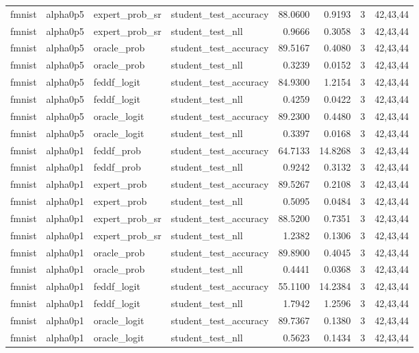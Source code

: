 \begin{tabular}{llllrrrl}
fmnist & alpha0p5 & expert\_prob\_sr & student\_test\_accuracy & 88.0600 & 0.9193 & 3 & 42,43,44 \\
fmnist & alpha0p5 & expert\_prob\_sr & student\_test\_nll & 0.9666 & 0.3058 & 3 & 42,43,44 \\
fmnist & alpha0p5 & oracle\_prob & student\_test\_accuracy & 89.5167 & 0.4080 & 3 & 42,43,44 \\
fmnist & alpha0p5 & oracle\_prob & student\_test\_nll & 0.3239 & 0.0152 & 3 & 42,43,44 \\
fmnist & alpha0p5 & feddf\_logit & student\_test\_accuracy & 84.9300 & 1.2154 & 3 & 42,43,44 \\
fmnist & alpha0p5 & feddf\_logit & student\_test\_nll & 0.4259 & 0.0422 & 3 & 42,43,44 \\
fmnist & alpha0p5 & oracle\_logit & student\_test\_accuracy & 89.2300 & 0.4480 & 3 & 42,43,44 \\
fmnist & alpha0p5 & oracle\_logit & student\_test\_nll & 0.3397 & 0.0168 & 3 & 42,43,44 \\
fmnist & alpha0p1 & feddf\_prob & student\_test\_accuracy & 64.7133 & 14.8268 & 3 & 42,43,44 \\
fmnist & alpha0p1 & feddf\_prob & student\_test\_nll & 0.9242 & 0.3132 & 3 & 42,43,44 \\
fmnist & alpha0p1 & expert\_prob & student\_test\_accuracy & 89.5267 & 0.2108 & 3 & 42,43,44 \\
fmnist & alpha0p1 & expert\_prob & student\_test\_nll & 0.5095 & 0.0484 & 3 & 42,43,44 \\
fmnist & alpha0p1 & expert\_prob\_sr & student\_test\_accuracy & 88.5200 & 0.7351 & 3 & 42,43,44 \\
fmnist & alpha0p1 & expert\_prob\_sr & student\_test\_nll & 1.2382 & 0.1306 & 3 & 42,43,44 \\
fmnist & alpha0p1 & oracle\_prob & student\_test\_accuracy & 89.8900 & 0.4045 & 3 & 42,43,44 \\
fmnist & alpha0p1 & oracle\_prob & student\_test\_nll & 0.4441 & 0.0368 & 3 & 42,43,44 \\
fmnist & alpha0p1 & feddf\_logit & student\_test\_accuracy & 55.1100 & 14.2384 & 3 & 42,43,44 \\
fmnist & alpha0p1 & feddf\_logit & student\_test\_nll & 1.7942 & 1.2596 & 3 & 42,43,44 \\
fmnist & alpha0p1 & oracle\_logit & student\_test\_accuracy & 89.7367 & 0.1380 & 3 & 42,43,44 \\
fmnist & alpha0p1 & oracle\_logit & student\_test\_nll & 0.5623 & 0.1434 & 3 & 42,43,44 \\

\end{tabular}
